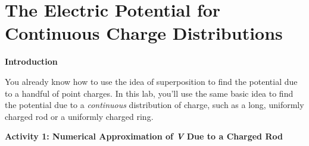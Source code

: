 \section{The Electric Potential for Continuous Charge Distributions}
\label{potential_charge_distributions}

\makelabheader %

\bigskip

\textbf{Introduction} 

You already know how to use the idea of superposition to find the potential due to a handful of point charges.  In this lab, you'll use the same basic idea to find the potential due to a \textit{continuous} distribution of charge, such as a long, uniformly charged rod or a uniformly charged ring.

\bigskip

\textbf{Activity 1: Numerical Approximation of \textit{V} Due to a Charged Rod}

